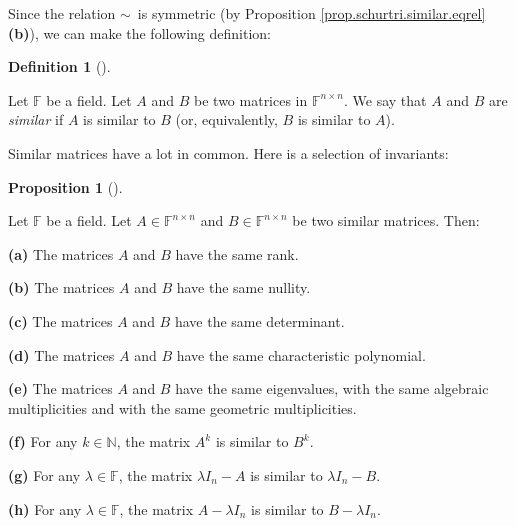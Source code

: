 \documentclass[numbers=enddot,12pt,final,onecolumn,notitlepage]{scrartcl}%
\numberwithin{exer}{subsection}
\theoremstyle{definition}
\newtheorem{prop}[theo]{Proposition}
\newenvironment{proposition}[1][]
{\begin{prop}[#1]\begin{leftbar}}
{\end{leftbar}\end{prop}}
\newtheorem{defi}[theo]{Definition}
\newenvironment{definition}[1][]
{\begin{defi}[#1]\begin{leftbar}}
{\end{leftbar}\end{defi}}
\begin{document}
Since the relation $\sim$\ is symmetric (by Proposition
\ref{prop.schurtri.similar.eqrel} \textbf{(b)}), we can make the following definition:

\begin{definition}
Let $\mathbb{F}$ be a field. Let $A$ and $B$ be two matrices in $\mathbb{F}%
^{n\times n}$. We say that $A$ and $B$ are \emph{similar} if $A$ is similar to
$B$ (or, equivalently, $B$ is similar to $A$).
\end{definition}

Similar matrices have a lot in common. Here is a selection of invariants:

\begin{proposition}
\label{prop.schurtri.similar.same}Let $\mathbb{F}$ be a field. Let
$A\in\mathbb{F}^{n\times n}$ and $B\in\mathbb{F}^{n\times n}$ be two similar
matrices. Then: \medskip

\textbf{(a)} The matrices $A$ and $B$ have the same rank. \medskip

\textbf{(b)} The matrices $A$ and $B$ have the same nullity. \medskip

\textbf{(c)} The matrices $A$ and $B$ have the same determinant. \medskip

\textbf{(d)} The matrices $A$ and $B$ have the same characteristic polynomial.
\medskip

\textbf{(e)} The matrices $A$ and $B$ have the same eigenvalues, with the same
algebraic multiplicities and with the same geometric multiplicities. \medskip

\textbf{(f)} For any $k\in\mathbb{N}$, the matrix $A^{k}$ is similar to
$B^{k}$. \medskip

\textbf{(g)} For any $\lambda\in\mathbb{F}$, the matrix $\lambda I_{n}-A$ is
similar to $\lambda I_{n}-B$.\medskip

\textbf{(h)} For any $\lambda\in\mathbb{F}$, the matrix $A-\lambda I_{n}$ is
similar to $B-\lambda I_{n}$.
\end{proposition}
\end{document}
